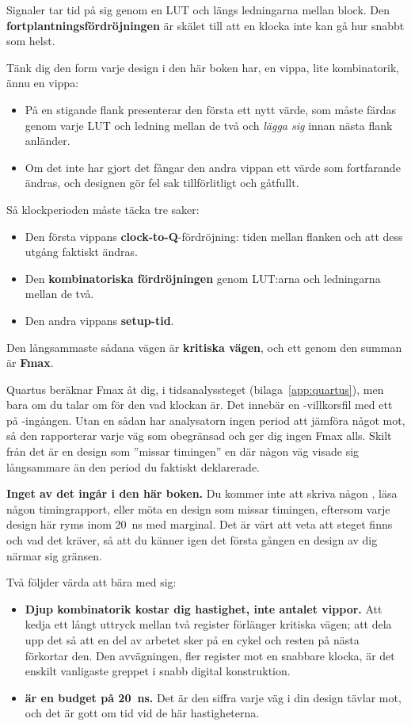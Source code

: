 Signaler tar tid på sig genom en LUT och längs ledningarna mellan block. Den
\textbf{fortplantningsfördröjningen} är skälet till att en klocka inte kan gå hur snabbt som helst.

Tänk dig den form varje design i den här boken har, en vippa, lite kombinatorik, ännu en vippa:
\begin{itemize}
  \item På en stigande flank presenterar den första ett nytt värde, som måste färdas genom varje
    LUT och ledning mellan de två och \emph{lägga sig} innan nästa flank anländer.
  \item Om det inte har gjort det fångar den andra vippan ett värde som fortfarande ändras, och
    designen gör fel sak tillförlitligt och gåtfullt.
\end{itemize}

Så klockperioden måste täcka tre saker:
\begin{itemize}
  \item Den första vippans \textbf{clock-to-Q}-fördröjning: tiden mellan flanken och att dess
    utgång faktiskt ändras.
  \item Den \textbf{kombinatoriska fördröjningen} genom LUT:arna och ledningarna mellan de två.
  \item Den andra vippans \textbf{setup-tid}.
\end{itemize}

Den långsammaste sådana vägen är \textbf{kritiska vägen}, och ett genom den summan är \textbf{Fmax}.

Quartus beräknar Fmax åt dig, i tidsanalyssteget (bilaga~\ref{app:quartus}), men bara om du talar
om för den vad klockan är. Det innebär en -villkorsfil med ett  på
-ingången. Utan en sådan har analysatorn ingen period att jämföra något mot, så den
rapporterar varje väg som obegränsad och ger dig ingen Fmax alls. Skilt från det är en design som
”missar timingen” en där någon väg visade sig långsammare än den period du faktiskt deklarerade.

\textbf{Inget av det ingår i den här boken.} Du kommer inte att skriva någon , läsa
någon timingrapport, eller möta en design som missar timingen, eftersom varje design här ryms inom
20~ns med marginal. Det är värt att veta att steget finns och vad det kräver, så att du känner igen
det första gången en design av dig närmar sig gränsen.

Två följder värda att bära med sig:
\begin{itemize}
  \item \textbf{Djup kombinatorik kostar dig hastighet, inte antalet vippor.} Att kedja ett långt
    uttryck mellan två register förlänger kritiska vägen; att dela upp det så att en del av arbetet
    sker på en cykel och resten på nästa förkortar den. Den avvägningen, fler register mot en
    snabbare klocka, är det enskilt vanligaste greppet i snabb digital konstruktion.
  \item \textbf{ är en budget på 20~ns.} Det är den siffra varje väg i din design
    tävlar mot, och det är gott om tid vid de här hastigheterna.
\end{itemize}

